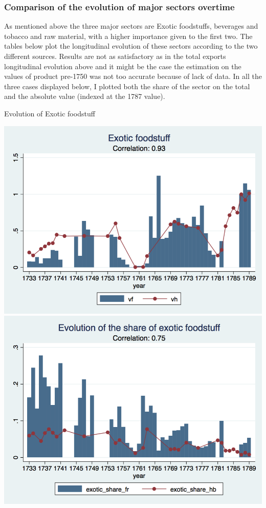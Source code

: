 \documentclass[12pt,a4paper,titlepage,english]{article}
\begin{document}
\subsubsection{Comparison of the evolution of major sectors overtime}
As mentioned above the three major sectors are Exotic foodstuffs, beverages and tobacco and raw material, with a higher importance given to the first two. The tables below plot the longitudinal evolution of these sectors according to the two different sources. Results are not as satisfactory as in the total exports longitudinal evolution above and it might be the case the estimation on the values of product pre-1750 was not too accurate because of lack of data. In all the three cases displayed below, I plotted both the share of the sector on the total and the absolute value (indexed at the 1787 value). 
\caption{Evolution of Exotic foodstuff}
\includegraphics[scale=.28]{exotic_food_long.png}
\includegraphics[scale=.28]{exotic_food_share.png}\\
\end{document}
